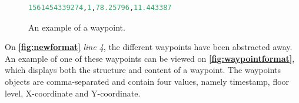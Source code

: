 \begin{figure}[H]
\lstset{numbers=left}
\begin{lstlisting}[language=Python]
1561454339274,1,78.25796,11.443387
\end{lstlisting}
\caption{An example of a waypoint.}
\label{fig:waypointformat}
\end{figure}

On \textbf{\autoref{fig:newformat}} \textit{line 4}, the different waypoints have been abstracted away. An example of one of these waypoints can be viewed on \textbf{\autoref{fig:waypointformat}}, which displays both the structure and content of a waypoint. The waypoints objects are comma-separated and contain four values, namely timestamp, floor level, X-coordinate and Y-coordinate.

